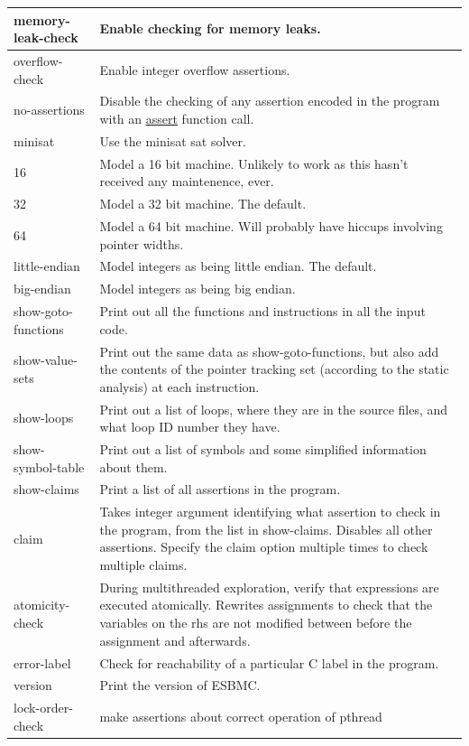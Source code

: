 \documentclass{article}
\begin{document}
\begin{longtable}{| p{} | p{} |}
memory-leak-check & Enable checking for memory leaks.\\
\hline
overflow-check & Enable integer overflow assertions.\\
\hline
no-assertions & Disable the checking of any assertion encoded in the program
with an \url{assert} function call.\\
\hline
minisat & Use the minisat sat solver.\\
\hline
16 & Model a 16 bit machine. Unlikely to work as this hasn't received any
maintenence, ever.\\
\hline
32 & Model a 32 bit machine. The default.\\
\hline
64 & Model a 64 bit machine. Will probably have hiccups involving pointer
widths.\\
\hline
little-endian & Model integers as being little endian. The default.\\
\hline
big-endian & Model integers as being big endian.\\
\hline
show-goto-functions & Print out all the functions and instructions in all the
input code.\\
\hline
show-value-sets & Print out the same data as show-goto-functions, but also
add the contents of the pointer tracking set (according to the static analysis)
at each instruction.\\
\hline
show-loops & Print out a list of loops, where they are in the source files,
and what loop ID number they have.\\
\hline
show-symbol-table & Print out a list of symbols and some simplified
information about them.\\
\hline
show-claims & Print a list of all assertions in the program.\\
\hline
claim & Takes integer argument identifying what assertion to check in the
program, from the list in show-claims. Disables all other assertions. Specify
the claim option multiple times to check multiple claims.\\
\hline
atomicity-check & During multithreaded exploration, verify that expressions
are executed atomically. Rewrites assignments to check that the variables on the
rhs are not modified between before the assignment and afterwards.\\
\hline
error-label & Check for reachability of a particular C label in the program.\\
\hline
version & Print the version of ESBMC.\\
\hline
lock-order-check & make assertions about correct operation of pthread

\end{longtable}
\end{document}
